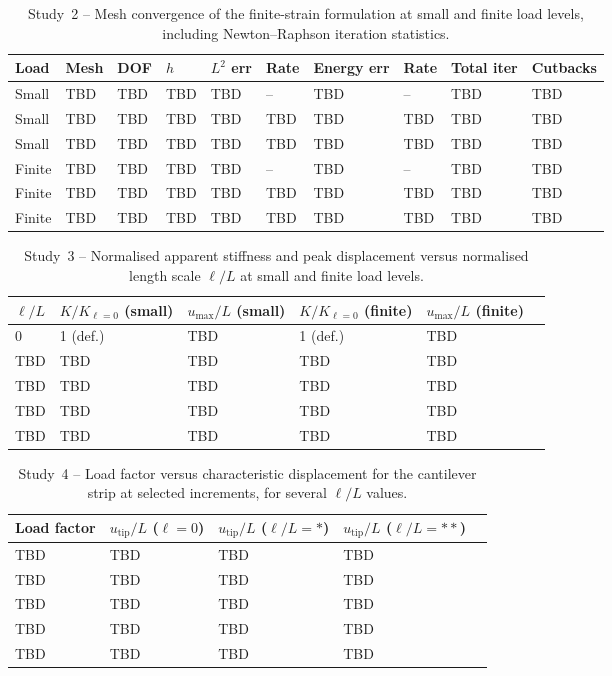 \documentclass[11pt]{article}
\begin{document}
\begin{table}[h]
\centering
\caption{Study~2 -- Mesh convergence of the finite-strain
  formulation at small and finite load levels, including
  Newton--Raphson iteration statistics.}
\label{tab:s9_conv_nl}
\begin{tabular}{llllllllll}
\toprule
Load & Mesh & DOF & $h$ & $L^2$ err & Rate
  & Energy err & Rate & Total iter & Cutbacks \\
\midrule
Small & TBD & TBD & TBD & TBD & -- & TBD & -- & TBD & TBD \\
Small & TBD & TBD & TBD & TBD & TBD & TBD & TBD & TBD & TBD \\
Small & TBD & TBD & TBD & TBD & TBD & TBD & TBD & TBD & TBD \\
Finite & TBD & TBD & TBD & TBD & -- & TBD & -- & TBD & TBD \\
Finite & TBD & TBD & TBD & TBD & TBD & TBD & TBD & TBD & TBD \\
Finite & TBD & TBD & TBD & TBD & TBD & TBD & TBD & TBD & TBD \\
\bottomrule
\end{tabular}
\end{table}

\begin{table}[h]
\centering
\caption{Study~3 -- Normalised apparent stiffness and peak
  displacement versus normalised length scale $\ell/L$ at
  small and finite load levels.}
\label{tab:s9_sizeeffect}
\begin{tabular}{llllll}
\toprule
$\ell/L$ &
$K/K_{\ell=0}$ (small) & $u_{\max}/L$ (small) &
$K/K_{\ell=0}$ (finite) & $u_{\max}/L$ (finite) \\
\midrule
0    & 1 (def.) & TBD & 1 (def.) & TBD \\
TBD  & TBD & TBD & TBD & TBD \\
TBD  & TBD & TBD & TBD & TBD \\
TBD  & TBD & TBD & TBD & TBD \\
TBD  & TBD & TBD & TBD & TBD \\
\bottomrule
\end{tabular}
\end{table}

\begin{table}[h]
\centering
\caption{Study~4 -- Load factor versus characteristic
  displacement for the cantilever strip at selected increments,
  for several $\ell/L$ values.}
\label{tab:s9_loaddisp}
\begin{tabular}{lllll}
\toprule
Load factor & $u_{\mathrm{tip}}/L$ ($\ell=0$)
  & $u_{\mathrm{tip}}/L$ ($\ell/L=*$)
  & $u_{\mathrm{tip}}/L$ ($\ell/L=**$) \\
\midrule
TBD & TBD & TBD & TBD \\
TBD & TBD & TBD & TBD \\
TBD & TBD & TBD & TBD \\
TBD & TBD & TBD & TBD \\
TBD & TBD & TBD & TBD \\
\bottomrule
\end{tabular}
\end{table}
\end{document}
